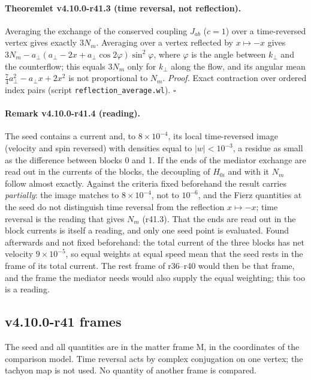 \paragraph{Theoremlet v4.10.0-r41.3 (time reversal, not reflection).}
Averaging the exchange of the conserved coupling \(J_{ab}\) (\(c=1\)) over a time-reversed vertex gives exactly \(3N_m\).  Averaging over a vertex reflected
by \(x\mapsto-x\) gives \(3N_m-a_\perp(a_\perp-2x+a_\perp\cos2\varphi)\sin^2\varphi\), where \(\varphi\) is the angle between \(k_\perp\) and the counterflow; this
equals \(3N_m\) only for \(k_\perp\) along the flow, and its angular mean \(\tfrac74a_\perp^2-a_\perp x+2x^2\) is not proportional to \(N_m\).
\emph{Proof.} Exact contraction over ordered index pairs (script \texttt{reflection\_\allowbreak average.wl}).  \(\square\)

\paragraph{Remark v4.10.0-r41.4 (reading).}
The seed contains a current and, to \(8\times10^{-4}\), its local time-reversed image (velocity and spin reversed) with densities equal to
\(|w|<10^{-3}\), a residue as small as the difference between blocks 0 and 1.  If the ends of the mediator exchange are read out in the currents of
the blocks, the decoupling of \(H_{0i}\) and with it \(N_m\) follow almost exactly.  Against the criteria fixed beforehand the result carries
\emph{partially}: the image matches to \(8\times10^{-4}\), not to \(10^{-6}\), and the Fierz quantities at the seed do not distinguish time reversal from
the reflection \(x\mapsto-x\); time reversal is the reading that gives \(N_m\) (r41.3).  That the ends are read out in the block currents is itself a
reading, and only one seed point is evaluated.  Found afterwards and not fixed beforehand: the total current of the three blocks has net velocity
\(9\times10^{-5}\), so equal weights at equal speed mean that the seed rests in the frame of its total current.  The rest frame of r36--r40 would then be
that frame, and the frame the mediator needs would also supply the equal weighting; this too is a reading.

\subsection*{v4.10.0-r41 frames}
\label{subsec:v4100-r41-frames}

The seed and all quantities are in the matter frame M, in the coordinates of the comparison model.  Time reversal acts by complex conjugation
on one vertex; the tachyon map is not used.  No quantity of another frame is compared.

